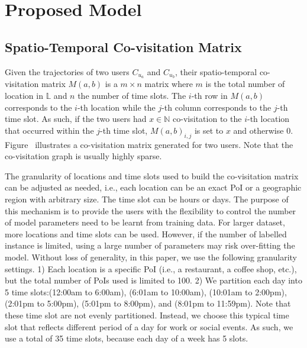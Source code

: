 \section{Proposed Model} \label{sec:model}

\subsection{Spatio-Temporal Co-visitation Matrix}

Given the trajectories of two users $C_{u_a}$ and $C_{u_b}$, their spatio-temporal co-visitation matrix $M(a,b)$ is a $m \times n$ matrix where $m$ is the total number of location in $\mathbb{L}$ and $n$ the number of time slots. The $i$-th row in $M(a,b)$ corresponds to the $i$-th location while the $j$-th column corresponds to the $j$-th time slot. As such, if the two users had $x \in \mathbb{N}$ co-visitation to the $i$-th location that occurred within the $j$-th time slot, $M(a,b)_{i,j}$ is set to $x$ and otherwise 0. Figure~ illustrates a co-visitation matrix generated for two users. Note that the co-visitation graph is usually highly sparse.

The granularity of locations and time slots used to build the co-visitation matrix can be adjusted as needed, i.e., each location can be an exact PoI or a geographic region with arbitrary size. The time slot can be hours or days. The purpose of this mechanism is to provide the users with the flexibility to control the number of model parameters need to be learnt from training data. For larger dataset, more locations and time slots can be used. However, if the number of labelled instance is limited, using a large number of parameters may risk over-fitting the model. Without loss of generality, in this paper, we use the following granularity settings. 1) Each location is a specific PoI (i.e., a restaurant, a coffee shop, etc.), but the total number of PoIs used is limited to 100. 2) We partition each day into 5 time slots:(12:00am to 6:00am), (6:01am to 10:00am), (10:01am to 2:00pm), (2:01pm to 5:00pm), (5:01pm to 8:00pm), and (8:01pm to 11:59pm). Note that these time slot are not evenly partitioned. Instead, we choose this typical time slot that reflects different period of a day for work or social events. As such, we use a total of 35 time slots, because each day of a week has 5 slots.

